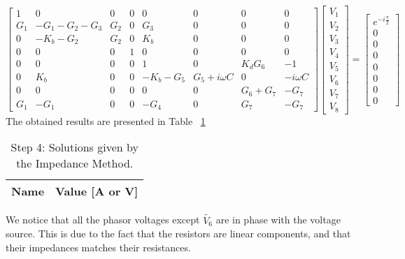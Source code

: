\begin{equation}
	\begin{bmatrix}
		1 & 0 & 0 & 0 & 0 & 0 & 0 & 0 \\
		G_1 & -G_1 - G_2 -G_3 & G_2 & 0 & G_3 & 0 & 0 & 0 \\
		0 & -K_b - G_2 & G_2 & 0 & K_b & 0 & 0 & 0 \\
		0 & 0 & 0 & 1 & 0 & 0 & 0 & 0 \\
		0 & 0 & 0 & 0 & 1 & 0 & K_dG_6 & -1 \\
		0 & K_b & 0 & 0 & -K_b - G_5 & G_5 + i\omega C & 0 & -i\omega C \\
		0 & 0 & 0 & 0 & 0 & 0 & G_6 + G_7 & -G_7 \\
		G_1 & -G_1 & 0 & 0 & -G_4 & 0 & G_7 & -G_7 
	\end{bmatrix}
	\begin{bmatrix}
		V_1 \\
		V_2 \\
		V_3 \\
		V_4 \\
		V_5 \\
		V_6 \\
		V_7 \\
		V_8
	\end{bmatrix}
	=  
	\begin{bmatrix}
		e^{-i\frac{\pi}{2}} \\
		0 \\
		0 \\
		0 \\
		0 \\
		0 \\
		0 \\
		0
	\end{bmatrix}
\end{equation}
The obtained results are presented in Table ~\ref{tab:nodal3}

\FloatBarrier
\begin{table}[h]
	\centering
	\begin{tabular}{|l|r|}
		\hline    
		{\bf Name} & {\bf Value [A or V]} \\ \hline
		
	\end{tabular}
	\caption{Step 4: Solutions given by the Impedance Method.}
	\label{tab:nodal3}
\end{table}
\FloatBarrier

We notice that all the phasor voltages except $\tilde{V_6}$ are in phase with the voltage source. This is due to the fact that the resistors are linear components, and that their impedances matches their resistances.

